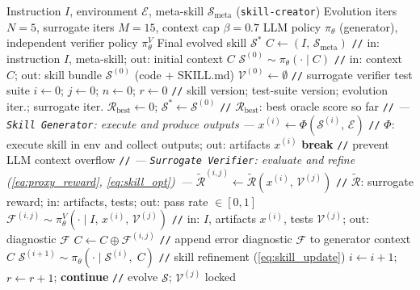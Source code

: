 \documentclass{article}
\newcommand{\method}{\textit{CoEvoSkills}\xspace}
\newcommand{\skill}{\mathcal{S}}
\begin{document}
\begin{algorithm}[t]
\caption{\method co-evolution Algorithm}
\label{alg:evolution}
\small
\begin{algorithmic}[1]
\REQUIRE Instruction $I$, environment $\mathcal{E}$, meta-skill $\skill_{\mathrm{meta}}$ (\texttt{skill-creator})
\REQUIRE Evolution iters $N{=}5$, surrogate iters $M{=}15$, context cap $\beta{=}0.7$
\REQUIRE LLM policy $\pi_\theta$ (generator), independent verifier policy $\pi_\theta^{V}$
\ENSURE Final evolved skill $\skill^*$
\STATE $C \leftarrow (I,\, \skill_{\mathrm{meta}})$ \hfill \texttt{//} in: instruction $I$, meta-skill; out: initial context $C$
\STATE $\skill^{(0)} \sim \pi_\theta\!\left(\cdot \mid C\right)$ \hfill \texttt{//} in: context $C$; out: skill bundle $\skill^{(0)}$ (code + SKILL.md)
\STATE $\mathcal{V}^{(0)} \leftarrow \emptyset$ \hfill \texttt{//} surrogate verifier test suite
\STATE $i \leftarrow 0$;\; $j \leftarrow 0$;\; $n \leftarrow 0$;\; $r \leftarrow 0$ \hfill \texttt{//} skill version; test-suite version; evolution iter.; surrogate iter.
\STATE $\mathcal{R}_{\mathrm{best}} \leftarrow 0$;\; $\skill^* \leftarrow \skill^{(0)}$ \hfill \texttt{//} $\mathcal{R}_{\mathrm{best}}$: best oracle score so far
    \STATE \texttt{//} \textit{--- \texttt{Skill Generator}: execute and produce outputs ---}
    \STATE $x^{(i)} \leftarrow \Phi(\skill^{(i)},\, \mathcal{E})$ \hfill \texttt{//} $\Phi$: execute skill in env and collect outputs; out: artifacts $x^{(i)}$
        \STATE \textbf{break} \hfill \texttt{//} prevent LLM context overflow
    \ENDIF
    \STATE \texttt{//} \textit{--- \texttt{Surrogate Verifier}: evaluate and refine (\autoref{eq:proxy_reward}, \autoref{eq:skill_opt})\ ---}
    \STATE $\tilde{\mathcal{R}}^{(i,j)} \leftarrow \tilde{\mathcal{R}}(x^{(i)},\, \mathcal{V}^{(j)})$ \hfill \texttt{//} $\tilde{\mathcal{R}}$: surrogate reward; in: artifacts, tests; out: pass rate $\in [0,1]$
        \STATE $\mathcal{F}^{(i,j)} \sim \pi_\theta^{V}\!\left(\cdot \mid I,\, x^{(i)},\, \mathcal{V}^{(j)}\right)$ \hfill \texttt{//} in: $I$, artifacts $x^{(i)}$, tests $\mathcal{V}^{(j)}$; out: diagnostic $\mathcal{F}$
        \STATE $C \leftarrow C \oplus \mathcal{F}^{(i,j)}$ \hfill \texttt{//} append error diagnostic $\mathcal{F}$ to generator context $C$
        \STATE $\skill^{(i+1)} \sim \pi_\theta\!\left(\cdot \mid \skill^{(i)},\; C\right)$ \hfill \texttt{//} skill refinement (\autoref{eq:skill_update})
        \STATE $i \leftarrow i{+}1$;\; $r \leftarrow r{+}1$;\; \textbf{continue} \hfill \texttt{//} evolve $\skill$; $\mathcal{V}^{(j)}$ locked

\end{algorithmic}
\end{algorithm}
\end{document}
